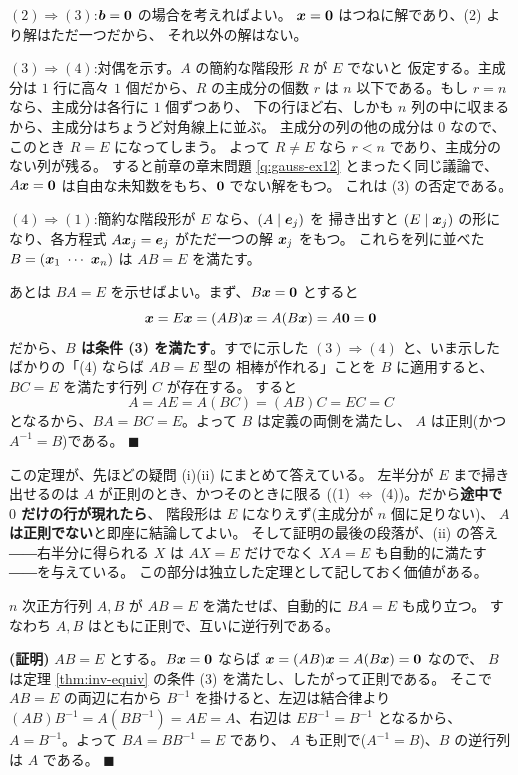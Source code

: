 $(2) \Rightarrow (3)$:$\bm{b} = \bm{0}$ の場合を考えればよい。
$\bm{x} = \bm{0}$ はつねに解であり、(2) より解はただ一つだから、
それ以外の解はない。

$(3) \Rightarrow (4)$:対偶を示す。$A$ の簡約な階段形 $R$ が $E$ でないと
仮定する。主成分は $1$ 行に高々 $1$ 個だから、$R$ の主成分の個数 $r$ は
$n$ 以下である。もし $r = n$ なら、主成分は各行に $1$ 個ずつあり、
下の行ほど右、しかも $n$ 列の中に収まるから、主成分はちょうど対角線上に並ぶ。
主成分の列の他の成分は $0$ なので、このとき $R = E$ になってしまう。
よって $R \neq E$ なら $r < n$ であり、主成分のない列が残る。
すると前章の章末問題 \ref{q:gauss-ex12} とまったく同じ議論で、
$A\bm{x} = \bm{0}$ は自由な未知数をもち、$\bm{0}$ でない解をもつ。
これは (3) の否定である。

$(4) \Rightarrow (1)$:簡約な階段形が $E$ なら、$(A \mid \bm{e}_j)$ を
掃き出すと $(E \mid \bm{x}_j)$ の形になり、各方程式
$A\bm{x}_j = \bm{e}_j$ がただ一つの解 $\bm{x}_j$ をもつ。
これらを列に並べた $B = (\vect{x}_1 \ \cdots \ \vect{x}_n)$ は
$AB = E$ を満たす。

あとは $BA = E$ を示せばよい。まず、$B\bm{x} = \bm{0}$ とすると
\[
\bm{x} = E\bm{x} = (AB)\bm{x} = A(B\bm{x}) = A\bm{0} = \bm{0}
\]
だから、\textbf{$B$ は条件 (3) を満たす}。すでに示した
$(3) \Rightarrow (4)$ と、いま示したばかりの「(4) ならば $AB = E$ 型の
相棒が作れる」ことを $B$ に適用すると、$BC = E$ を満たす行列 $C$ が存在する。
すると
\[
A = AE = A(BC) = (AB)C = EC = C
\]
となるから、$BA = BC = E$。よって $B$ は定義の両側を満たし、
$A$ は正則(かつ $A^{-1} = B$)である。 $\blacksquare$

この定理が、先ほどの疑問 (i)(ii) にまとめて答えている。
左半分が $E$ まで掃き出せるのは $A$ が正則のとき、かつそのときに限る
((1) $\Leftrightarrow$ (4))。だから\textbf{途中で $0$ だけの行が現れたら}、
階段形は $E$ になりえず(主成分が $n$ 個に足りない)、
\textbf{$A$ は正則でない}と即座に結論してよい。
そして証明の最後の段落が、(ii) の答え――右半分に得られる $X$ は
$AX = E$ だけでなく $XA = E$ も自動的に満たす――を与えている。
この部分は独立した定理として記しておく価値がある。

\begin{teiri}[片側の逆は両側の逆]\label{thm:onesided}
$n$ 次正方行列 $A, B$ が $AB = E$ を満たせば、自動的に $BA = E$ も成り立つ。
すなわち $A, B$ はともに正則で、互いに逆行列である。
\end{teiri}

\noindent\textbf{(証明)}\quad
$AB = E$ とする。$B\bm{x} = \bm{0}$ ならば
$\bm{x} = (AB)\bm{x} = A(B\bm{x}) = \bm{0}$ なので、
$B$ は定理 \ref{thm:inv-equiv} の条件 (3) を満たし、したがって正則である。
そこで $AB = E$ の両辺に右から $B^{-1}$ を掛けると、左辺は結合律より
$(AB)B^{-1} = A(BB^{-1}) = AE = A$、右辺は $EB^{-1} = B^{-1}$ となるから、
$A = B^{-1}$。よって $BA = BB^{-1} = E$ であり、
$A$ も正則で($A^{-1} = B$)、$B$ の逆行列は $A$ である。 $\blacksquare$

